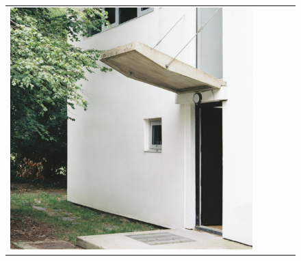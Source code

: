 \begin{figure}[H]
{\begin{tabular}{@{}ccccc@{}}
      \includegraphics[width=\linewidth]{Images/LoRAs/3D-effect/Training_images/5.jpg} \\[2pt]


\end{tabular}}
\end{figure}
